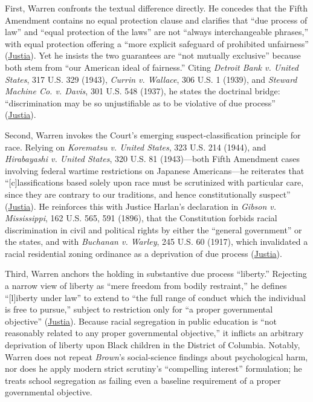 \documentclass[12pt]{article}
\begin{document}
First, Warren confronts the textual difference directly. He concedes that the Fifth Amendment contains no equal protection clause and clarifies that ``due process of law'' and ``equal protection of the laws'' are not ``always interchangeable phrases,'' with equal protection offering a ``more explicit safeguard of prohibited unfairness'' (\href{https://supreme.justia.com/cases/federal/us/347/497/}{Justia}). Yet he insists the two guarantees are ``not mutually exclusive'' because both stem from ``our American ideal of fairness.'' Citing \textit{Detroit Bank v. United States}, 317 U.S. 329 (1943), \textit{Currin v. Wallace}, 306 U.S. 1 (1939), and \textit{Steward Machine Co. v. Davis}, 301 U.S. 548 (1937), he states the doctrinal bridge: ``discrimination may be so unjustifiable as to be violative of due process'' (\href{https://supreme.justia.com/cases/federal/us/347/497/}{Justia}).

Second, Warren invokes the Court's emerging suspect-classification principle for race. Relying on \textit{Korematsu v. United States}, 323 U.S. 214 (1944), and \textit{Hirabayashi v. United States}, 320 U.S. 81 (1943)---both Fifth Amendment cases involving federal wartime restrictions on Japanese Americans---he reiterates that ``[c]lassifications based solely upon race must be scrutinized with particular care, since they are contrary to our traditions, and hence constitutionally suspect'' (\href{https://supreme.justia.com/cases/federal/us/347/497/}{Justia}). He reinforces this with Justice Harlan's declaration in \textit{Gibson v. Mississippi}, 162 U.S. 565, 591 (1896), that the Constitution forbids racial discrimination in civil and political rights by either the ``general government'' or the states, and with \textit{Buchanan v. Warley}, 245 U.S. 60 (1917), which invalidated a racial residential zoning ordinance as a deprivation of due process (\href{https://supreme.justia.com/cases/federal/us/347/497/}{Justia}).

Third, Warren anchors the holding in substantive due process ``liberty.'' Rejecting a narrow view of liberty as ``mere freedom from bodily restraint,'' he defines ``[l]iberty under law'' to extend to ``the full range of conduct which the individual is free to pursue,'' subject to restriction only for ``a proper governmental objective'' (\href{https://supreme.justia.com/cases/federal/us/347/497/}{Justia}). Because racial segregation in public education is ``not reasonably related to any proper governmental objective,'' it inflicts an arbitrary deprivation of liberty upon Black children in the District of Columbia. Notably, Warren does not repeat \textit{Brown}'s social-science findings about psychological harm, nor does he apply modern strict scrutiny's ``compelling interest'' formulation; he treats school segregation as failing even a baseline requirement of a proper governmental objective.
\end{document}
